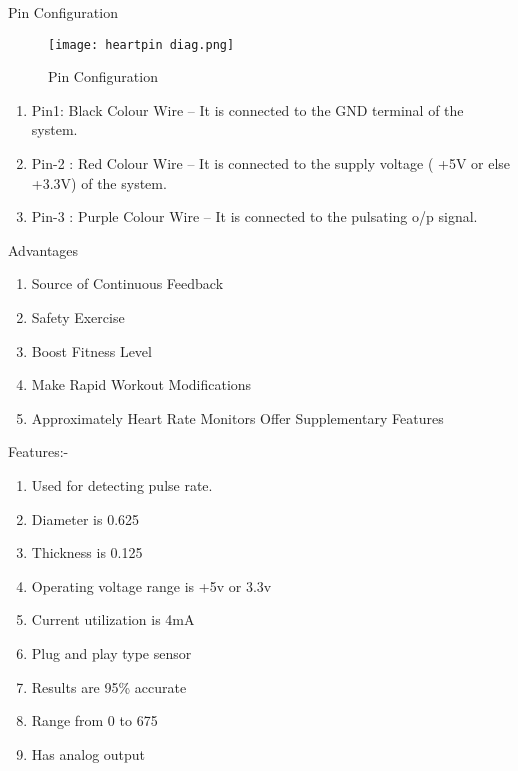 \documentclass[12pt,a4paper]{report}
\begin{document}
\noindent 

\noindent Pin Configuration 

\begin{figure}[htp]
    \texttt{[image: heartpin diag.png]}
    \caption{Pin Configuration }
\end{figure}
\begin{enumerate}
\item  Pin1: Black Colour Wire -- It is connected to the GND terminal of the system.

\item  Pin-2 : Red Colour Wire -- It is connected to the supply voltage ( +5V or else +3.3V) of the system.

\item  Pin-3 : Purple Colour Wire -- It is connected to the pulsating o/p signal.
\end{enumerate}

\noindent Advantages 

\begin{enumerate}
\item  Source of Continuous Feedback

\item  Safety Exercise

\item  Boost Fitness Level

\item  Make Rapid Workout Modifications

\item  Approximately Heart Rate Monitors Offer Supplementary Features
\end{enumerate}

\noindent Features:-  

\begin{enumerate}
\item  Used for detecting pulse rate.

\item  Diameter is 0.625

\item  Thickness is 0.125

\item  Operating voltage range is +5v or 3.3v

\item  Current utilization is 4mA

\item  Plug and play type sensor 

\item  Results are 95\% accurate 

\item  Range from 0 to 675

\item  Has analog output  
\end{enumerate}
\end{document}
